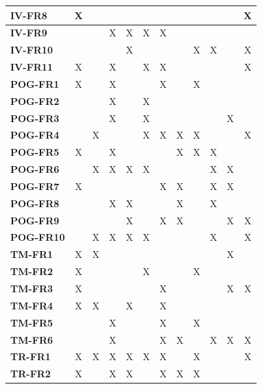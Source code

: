 \documentclass{article}
\begin{document}
\begin{table}[H]
\begin{adjustwidth}{-1.25in}{0in}
{\begin{tabular}{c|c|c|c|c|c|c|c|c|c|c|c|}
\multicolumn{1}{|l|}{\textbf{IV-FR8}} & X & & & & & & & & & & X \\ \hline
\multicolumn{1}{|l|}{\textbf{IV-FR9}} & & & X & X & X & X & & & & & \\ \hline
\multicolumn{1}{|l|}{\textbf{IV-FR10}} & & & & X & & & & X & X & & X \\ \hline
\multicolumn{1}{|l|}{\textbf{IV-FR11}} & X & & X & & X & X & & & & & X \\ \hline
\multicolumn{1}{|l|}{\textbf{POG-FR1}} & X & & X & & & X & & X & & & \\ \hline
\multicolumn{1}{|l|}{\textbf{POG-FR2}} & & & X & & X & & & & & & \\ \hline
\multicolumn{1}{|l|}{\textbf{POG-FR3}} & & & X & & X & & & & & X & \\ \hline
\multicolumn{1}{|l|}{\textbf{POG-FR4}} & & X & & & X & X & X & X & & & X \\ \hline
\multicolumn{1}{|l|}{\textbf{POG-FR5}} & X & & X & & & & X & X & X & & \\ \hline
\multicolumn{1}{|l|}{\textbf{POG-FR6}} & & X & X & X & X & & & & X & X & \\ \hline
\multicolumn{1}{|l|}{\textbf{POG-FR7}} & X & & & & & X & X & & X & X & \\ \hline
\multicolumn{1}{|l|}{\textbf{POG-FR8}} & & & X & X & & & X & & X & & \\ \hline
\multicolumn{1}{|l|}{\textbf{POG-FR9}} & & & & X & & X & X & & & X & X \\ \hline
\multicolumn{1}{|l|}{\textbf{POG-FR10}} & & X & X & X & X & & & & X & & X \\ \hline
\multicolumn{1}{|l|}{\textbf{TM-FR1}} & X & X & & & & & & & & X & \\ \hline
\multicolumn{1}{|l|}{\textbf{TM-FR2}} & X & & & & X & & & X & & & \\ \hline
\multicolumn{1}{|l|}{\textbf{TM-FR3}} & X & & & & & X & & & & X & X \\ \hline
\multicolumn{1}{|l|}{\textbf{TM-FR4}} & X & X & & X & & X & & & & & \\ \hline
\multicolumn{1}{|l|}{\textbf{TM-FR5}} & & & X & & & X & & X & & & \\ \hline
\multicolumn{1}{|l|}{\textbf{TM-FR6}} & & & X & & & X & X & & X & X & X \\ \hline
\multicolumn{1}{|l|}{\textbf{TR-FR1}} & X & X & X & X & X & X & & X & & & X \\ \hline
\multicolumn{1}{|l|}{\textbf{TR-FR2}} & X & & X & X & & X & X & X & & & \\ \hline

\end{tabular}}
\end{adjustwidth}
\end{table}
\end{document}
